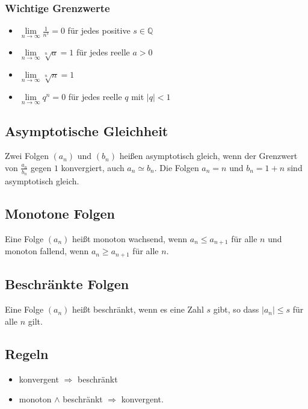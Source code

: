 \documentclass[10pt,a4paper,twoside,twocolumn]{article}
\begin{document}
	\subsubsection{Wichtige Grenzwerte}
	
	\begin{itemize}
		\setlength\itemsep{0em}
		\item $ \lim\limits_{n \to \infty} \frac{1}{n^s} = 0 $ für jedes positive $ s \in \mathbb{Q} $
		\item $ \lim\limits_{n \to \infty} \sqrt[n]{a} = 1 $ für jedes reelle $ a > 0$
		\item $ \lim\limits_{n \to \infty} \sqrt[n]{n} = 1 $
		\item $ \lim\limits_{n \to \infty} q^n = 0 $ für jedes reelle $ q $ mit $ |q| < 1 $
	\end{itemize}

	\subsection{Asymptotische Gleichheit}
	
	Zwei Folgen $ (a_n) $ und $ (b_n) $ heißen asymptotisch gleich, wenn der Grenzwert von $ \frac{a_n}{b_n} $ gegen $ 1 $ konvergiert, auch $ a_n \simeq b_n $. Die Folgen $ a_n = n $ und $ b_n = 1 + n $ sind asymptotisch gleich.
	
	\subsection{Monotone Folgen}
	
	Eine Folge $ (a_n) $ heißt monoton wachsend, wenn $ a_n \leq a_{n + 1} $ für alle $ n $ und monoton fallend, wenn $ a_n \geq a_{n + 1} $ für alle $ n $.
	
	\subsection{Beschränkte Folgen}
	
	Eine Folge $ (a_n) $ heißt beschränkt, wenn es eine Zahl $ s $ gibt, so dass $ |a_n| \leq s $ für alle $ n $ gilt.
	
	\subsection{Regeln}
	
	\begin{itemize}
		\setlength\itemsep{0em}
		\item konvergent $ \Rightarrow $ beschränkt
		\item monoton $ \land $ beschränkt $ \Rightarrow $ konvergent.
	\end{itemize}
\end{document}
